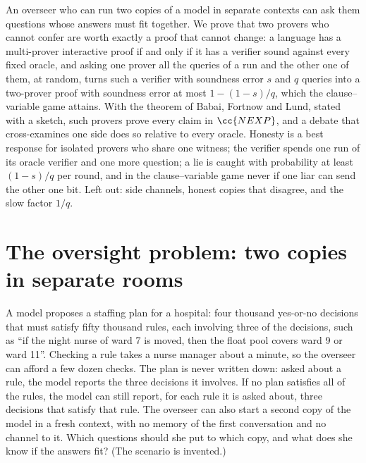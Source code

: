 \begin{refsection}
\newcommand{\crossexamval}{\mathrm{val}}
\newcommand{\crossexamchsh}{G_{\mathrm{CHSH}}}
\newcommand{\crossexamfort}{G_{\mathrm{F}}}
\newcommand{\crossexamket}[1]{\lvert#1\rangle}

\begin{chaptersummary}
An overseer who can run two copies of a model in separate contexts can ask them questions whose answers must fit together. We prove that two provers who cannot confer are worth exactly a proof that cannot change: a language has a multi-prover interactive proof if and only if it has a verifier sound against every fixed oracle, and asking one prover all the queries of a run and the other one of them, at random, turns such a verifier with soundness error $s$ and $q$ queries into a two-prover proof with soundness error at most $1-(1-s)/q$, which the clause--variable game attains. With the theorem of Babai, Fortnow and Lund, stated with a sketch, such provers prove every claim in $\cc{NEXP}$, and a debate that cross-examines one side does so relative to every oracle. Honesty is a best response for isolated provers who share one witness; the verifier spends one run of its oracle verifier and one more question; a lie is caught with probability at least $(1-s)/q$ per round, and in the clause--variable game never if one liar can send the other one bit. Left out: side channels, honest copies that disagree, and the slow factor $1/q$.
\end{chaptersummary}

\section{The oversight problem: two copies in separate rooms}\label{sec:crossexam:problem}

\begin{oversight}
A model proposes a staffing plan for a hospital: four thousand yes-or-no decisions that must satisfy fifty thousand rules, each involving three of the decisions, such as ``if the night nurse of ward 7 is moved, then the float pool covers ward 9 or ward 11''. Checking a rule takes a nurse manager about a minute, so the overseer can afford a few dozen checks. The plan is never written down: asked about a rule, the model reports the three decisions it involves. If no plan satisfies all of the rules, the model can still report, for each rule it is asked about, three decisions that satisfy that rule. The overseer can also start a second copy of the model in a fresh context, with no memory of the first conversation and no channel to it. Which questions should she put to which copy, and what does she know if the answers fit? (The scenario is invented.)
\end{oversight}


\end{refsection}
